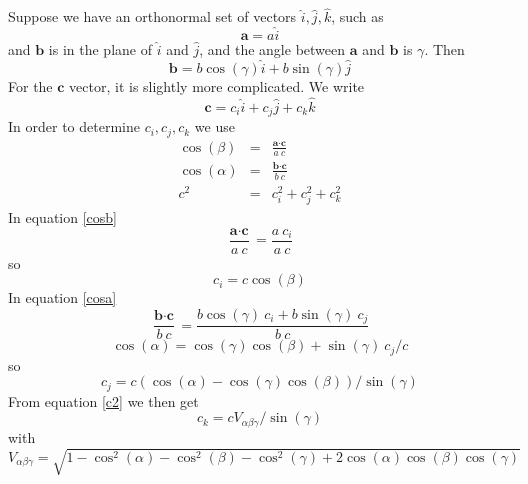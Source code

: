 \documentclass[prb]{revtex4}%
\begin{document}
Suppose we have an orthonormal set of vectors $\widehat{i}, \widehat{j}, \widehat{k}$, such as
\begin{equation}
    \textbf{a} = a \widehat{i}
\end{equation}
and  $\textbf{b}$ is in the plane of $\widehat{i}$ and $\widehat{j}$, and the angle between $\textbf{a}$ and $\textbf{b}$ is $\gamma$. Then
\begin{equation}
    \textbf{b} = b \cos(\gamma) \widehat{i} + b \sin(\gamma)
    \widehat{j}
\end{equation}
For the $\textbf{c}$ vector, it is slightly more complicated. We write
\begin{equation}
    \textbf{c} = c_i \widehat{i} + c_j \widehat{j} + c_k \widehat{k}
\end{equation}
In order to determine $c_i, c_j, c_k$ we use
\begin{eqnarray}
  \cos(\beta) &=& \frac{\textbf{a} \cdot \textbf{c}}{a\ c} \label{cosb}\\
  \cos(\alpha) &=& \frac{\textbf{b} \cdot \textbf{c}}{b\ c} \label{cosa}\\
  c^2 &=& c_i ^2 + c_j ^2 +c_k ^2\label{c2}
\end{eqnarray}
In equation \ref{cosb}
\begin{equation}
    \frac{\textbf{a} \cdot \textbf{c}}{a\ c} = \frac{a\ c_i}{a\ c}
\end{equation}
so
\begin{equation}
    c_i = c \cos(\beta)
\end{equation}
In equation \ref{cosa}
\begin{equation}
    \frac{\textbf{b} \cdot \textbf{c}}{b\ c} = \frac{b \cos(\gamma)\ c_i +b \sin(\gamma)\ c_j }{b\ c}
\end{equation}
\begin{equation}
   \cos(\alpha) = \cos(\gamma) \cos(\beta) + \sin(\gamma)\ c_j/c
\end{equation}
so
\begin{equation}
   c_j = c (\cos(\alpha) - \cos(\gamma) \cos(\beta)) / \sin(\gamma)
\end{equation}
From equation \ref{c2} we then get
\begin{equation}
    c_k = c V_{\alpha\beta\gamma}/\sin(\gamma)
\end{equation}
with
\begin{equation}
    V_{\alpha\beta\gamma} = \sqrt{1-\cos^2(\alpha)-\cos^2(\beta)-\cos^2(\gamma)+2 \cos(\alpha) \cos(\beta) \cos(\gamma)}
\end{equation}
\end{document}
